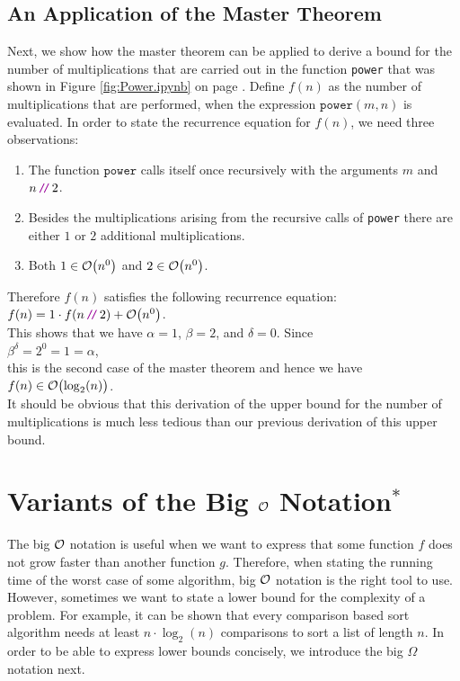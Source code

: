 \subsection{An Application of the Master Theorem}
Next, we show how the master theorem can be applied to derive a bound for the number of multiplications that
are carried out in the function \texttt{power} that was shown in Figure \ref{fig:Power.ipynb} on page
\pageref{fig:Power.ipynb}.  Define $f(n)$ as the number of multiplications that are performed, when the
expression $\mathtt{power}(m,n)$ is evaluated.  In order to state the recurrence equation for $f(n)$, we need
three observations:
\begin{enumerate}
\item The function $\texttt{power}$ calls itself once recursively with the arguments $m$ and $n\dv 2$.
\item Besides the multiplications arising from the recursive calls of \texttt{power} there are either
      $1$ or $2$ additional multiplications.
\item Both $1 \in \mathcal{O}\bigl(n^0\bigr)$ and $2 \in \mathcal{O}\bigl(n^0\bigr)$.
\end{enumerate}
Therefore $f(n)$ satisfies the following recurrence equation:
\\[0.2cm]
\hspace*{1.3cm}
$f(n) = 1 \cdot f(n \dv 2) + \Oh\bigl(n^0\bigr)$.
\\[0.2cm]
This shows that we have $\alpha = 1$, $\beta = 2$, and $\delta = 0$.  Since
\\[0.2cm]
\hspace*{1.3cm}
$\beta^\delta = 2^0 = 1 = \alpha$, 
\\[0.2cm]
this is the second case of the master theorem and hence we have
\\[0.2cm]
\hspace*{1.3cm}
$f(n) \in \mathcal{O}\bigl(\log_2(n)\bigr)$.
\\[0.2cm]
It should be obvious that this derivation of the upper bound for the number of multiplications is much less
tedious than our previous derivation of this upper bound.

\section{Variants of the Big $\mathcal{O}$ Notation$^*$}
The big $\mathcal{O}$ notation is useful when we want to express that some function $f$ does not grow faster
than another function $g$.  Therefore, when stating the running time of the worst case of some algorithm,
big $\mathcal{O}$ notation is the right tool to use.  However, sometimes we want to state a lower bound for
the complexity of a problem.  For example, it can be shown that every comparison based sort algorithm needs at least
$n \cdot \log_2(n)$ comparisons to sort a list of length $n$.  In order to be able to express lower
bounds concisely, we introduce the big $\Omega$ notation next.

